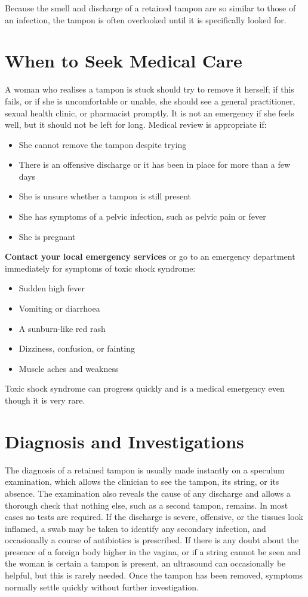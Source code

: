 Because the smell and discharge of a retained tampon are so similar to those of an infection, the tampon is often overlooked until it is specifically looked for.

\section*{When to Seek Medical Care}
A woman who realises a tampon is stuck should try to remove it herself; if this fails, or if she is uncomfortable or unable, she should see a general practitioner, sexual health clinic, or pharmacist promptly. It is not an emergency if she feels well, but it should not be left for long. Medical review is appropriate if:

\begin{itemize}
    \item She cannot remove the tampon despite trying
    \item There is an offensive discharge or it has been in place for more than a few days
    \item She is unsure whether a tampon is still present
    \item She has symptoms of a pelvic infection, such as pelvic pain or fever
    \item She is pregnant
\end{itemize}

\textbf{Contact your local emergency services} or go to an emergency department immediately for symptoms of toxic shock syndrome:
\begin{itemize}
    \item Sudden high fever
    \item Vomiting or diarrhoea
    \item A sunburn-like red rash
    \item Dizziness, confusion, or fainting
    \item Muscle aches and weakness
\end{itemize}

Toxic shock syndrome can progress quickly and is a medical emergency even though it is very rare.

\section*{Diagnosis and Investigations}
The diagnosis of a retained tampon is usually made instantly on a speculum examination, which allows the clinician to see the tampon, its string, or its absence. The examination also reveals the cause of any discharge and allows a thorough check that nothing else, such as a second tampon, remains. In most cases no tests are required. If the discharge is severe, offensive, or the tissues look inflamed, a swab may be taken to identify any secondary infection, and occasionally a course of antibiotics is prescribed. If there is any doubt about the presence of a foreign body higher in the vagina, or if a string cannot be seen and the woman is certain a tampon is present, an ultrasound can occasionally be helpful, but this is rarely needed. Once the tampon has been removed, symptoms normally settle quickly without further investigation.


